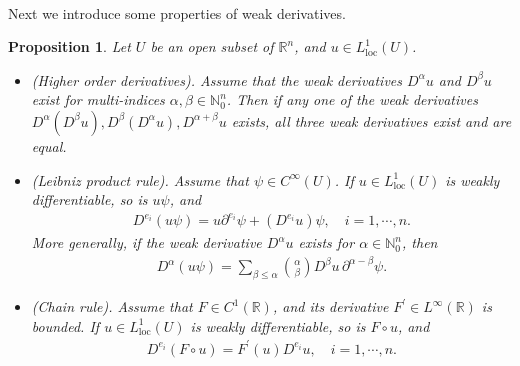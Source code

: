 \documentclass{article}
\numberwithin{equation}{section}
\newcommand{\bbN}{\mathbb{N}}
\newcommand{\bbR}{\mathbb{R}}
\newcommand{\loc}{\mathrm{loc}}
\theoremstyle{plain}
\newtheorem{proposition}[theorem]{Proposition}
\theoremstyle{definition}
\begin{document}
\paragraph{} Next we introduce some properties of weak derivatives. 
\begin{proposition}\label{prop:2.6}
Let $U$ be an open subset of $\bbR^n$, and $u\in L^1_\loc(U)$.
\begin{itemize}
	\item[(i)] (Higher order derivatives). Assume that the weak derivatives $D^\alpha u$ and $D^\beta u$ exist for multi-indices $\alpha,\beta\in\bbN_0^n$. Then if any one of the weak derivatives $D^\alpha(D^\beta u), D^\beta(D^\alpha u), D^{\alpha+\beta}u$ exists, all three weak derivatives exist and are equal.
	\item[(ii)] (Leibniz product rule). Assume that $\psi\in C^\infty(U)$. If $u\in L^1_\loc(U)$ is weakly differentiable, so is $u\psi$, and 
	\begin{align}
		D^{e_i}(u\psi)=u\partial^{e_i}\psi+(D^{e_i}u)\psi,\quad i=1,\cdots,n.\label{eq:2.1}
	\end{align}
    More generally, if the weak derivative $D^\alpha u$ exists for $\alpha\in\bbN_0^n$, then
    \begin{align}
    	D^\alpha(u\psi)=\sum_{\beta\leq\alpha}{\alpha\choose\beta}D^\beta u\,\partial^{\alpha-\beta}\psi.\label{eq:2.2}
    \end{align}
	\item[(iii)] (Chain rule). Assume that $F\in C^1(\bbR)$, and its derivative $F^\prime\in L^\infty(\bbR)$ is bounded. If $u\in L^1_\loc(U)$ is weakly differentiable, so is $F\circ u$, and
	\begin{align*}
		D^{e_i}(F\circ u)= F^\prime(u)D^{e_i}u,\quad i=1,\cdots,n.
	\end{align*}
\end{itemize}
\end{proposition}
\end{document}
